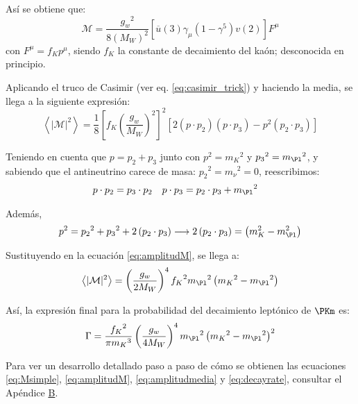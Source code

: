 Así se obtiene que:
\begin{equation}
\mathcal{M} =\dfrac{{g_{w}}^2}{8\left( M_W\right)^{2}}\left[ \overline{u}\left(3\right) \gamma_{\mu}\left( 1-\gamma^{5} \right) v\left( 2\right) \right] F^{\mu}\label{eq:Msimple}
\end{equation}
con $F^{\mu}=f_K p^{\mu}$, siendo $f_K$ la constante de decaimiento del kaón; desconocida en principio.

Aplicando el truco de Casimir (ver eq. \ref{eq:casimir_trick}) y haciendo la media, se llega a la siguiente expresión:
\begin{equation}
\left\langle |\mathcal{M}|^{2}\right\rangle=\dfrac{1}{8}\left[ f_{K}\left( \dfrac{g_w}{M_W}\right) ^{2}\right] ^{2}\left[2\left( p\cdot p_{2}\right) \left( p\cdot p_{3}\right) -p^{2}\left( p_{2}\cdot p_{3}\right)\right]\label{eq:amplitudM}
\end{equation}

Teniendo en cuenta que $p=p_{2}+p_{3}$ junto con $p^2={m_K}^2$ y ${p_3}^2={m_{\Pl}}^2$, y sabiendo que el antineutrino carece de masa: ${p_2}^2={m_{\nu}}^2=0$, reescribimos:
\begin{align}
p\cdot p_{2} &= p_{3} \cdot p_{2} & p \cdot p_{3} &= p_{2} \cdot p_{3}+{m_{\Pl}}^2
\end{align}

Además,
\begin{equation}
p^{2}={p_{2}}^{2}+{p_3}^{2}+2\left( p_{2} \cdot p_{3}\right) \longrightarrow 2\left( p_{2} \cdot p_{3}\right)=\left( m_{K}^{2}-m_{\Pl}^{2}\right)
\end{equation}

Sustituyendo en la ecuación \ref{eq:amplitudM}, se llega a:
\begin{equation}
\left\langle |\mathcal{M}|^{2}\right\rangle=\left( \dfrac{g_w}{2M_W}\right)^{4} {f_K}^2 {m_{\Pl}}^{2}\left( {m_{K}}^{2}-{m_{\Pl}}^{2}\right)\label{eq:amplitudmedia}
\end{equation}

Así, la expresión final para la probabilidad del decaimiento leptónico de $\PKm$ es:
\begin{equation}
\Gamma =\dfrac{{f_{K}}^{2}}{\pi {m_{K}}^{3}}\left( \dfrac{g_w}{4M_W}\right)^{4}{m_{\Pl}}^{2}\left({m_{K}}^{2}-{m_{\Pl}}^{2}\right)^{2}\label{eq:decayrate}
\end{equation}

Para ver un desarrollo detallado paso a paso de cómo se obtienen las ecuaciones \ref{eq:Msimple}, \ref{eq:amplitudM}, \ref{eq:amplitudmedia} y \ref{eq:decayrate}, consultar el Apéndice \hyperref[cap:B]{B}.

